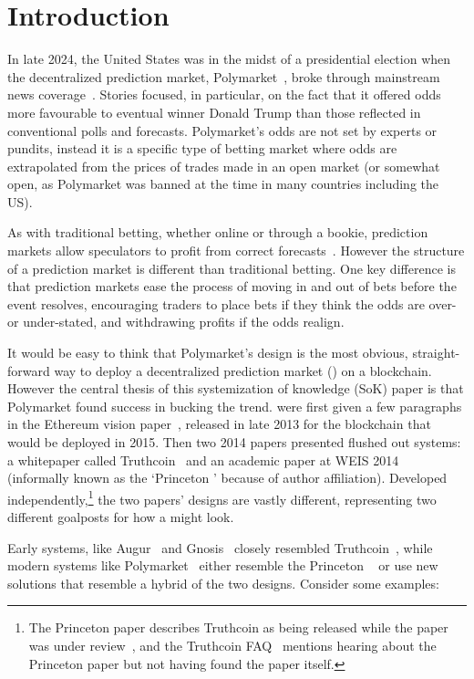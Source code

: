 \section{Introduction}

In late 2024, the United States was in the midst of a presidential election when the decentralized prediction market, Polymarket~\cite{poly}, broke through mainstream news coverage~\cite{Cha24,YBG24a}. Stories focused, in particular, on the fact that it offered odds more favourable to eventual winner Donald Trump than those reflected in conventional polls and forecasts. Polymarket's odds are not set by experts or pundits, instead it is a specific type of betting market where odds are extrapolated from the prices of trades made in an open market (or somewhat open, as Polymarket was banned at the time in many countries including the US). 

As with traditional betting, whether online or through a bookie, prediction markets allow speculators to profit from correct forecasts~\cite{AFGH+08,WoZi06}. However the structure of a prediction market is different than traditional betting. One key difference is that prediction markets ease the process of moving in and out of bets before the event resolves, encouraging traders to place bets if they think the odds are over- or under-stated, and withdrawing profits if the odds realign.

It would be easy to think that Polymarket's design is the most obvious, straight-forward way to deploy a decentralized prediction market (\depm) on a blockchain. However the central thesis of this systemization of knowledge (SoK) paper is that Polymarket found success in bucking the trend. \depms were first given a few paragraphs in the Ethereum vision paper~\cite{But13}, released in late 2013 for the blockchain that would be deployed in 2015. Then two 2014 papers presented flushed out systems: a whitepaper called Truthcoin~\cite{Sz14} and an academic paper at WEIS 2014~\cite{BCFKMN14} (informally known as the `Princeton \depm' because of author affiliation). Developed independently,\footnote{The Princeton paper describes Truthcoin as being released while the paper was under review~\cite{BCFKMN14}, and the Truthcoin FAQ~\cite{Sz14b} mentions hearing about the Princeton paper but not having found the paper itself.} the two papers' designs are vastly different, representing two different goalposts for how a \depm might look. 

Early systems, like Augur~\cite{AKPWZ15} and Gnosis~\cite{Gn17} closely resembled Truthcoin~\cite{Sz14}, while modern systems like Polymarket~\cite{poly} either resemble the Princeton \depm~\cite{BCFKMN14} or use new solutions that resemble a hybrid of the two designs. Consider some examples:

